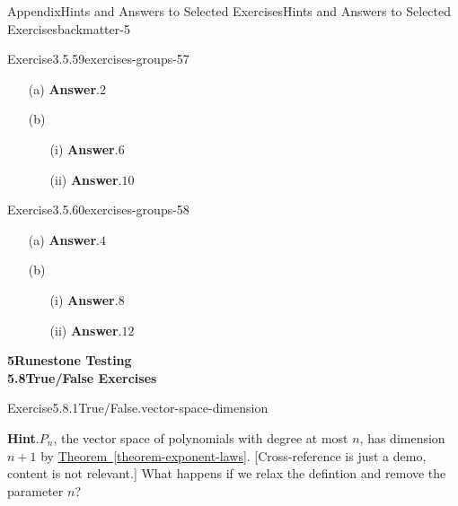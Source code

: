 \documentclass[oneside,10pt,]{book}
\newcommand{\blocktitlefont}{\relax}
\newcommand{\xreffont}{\relax}
\numberwithin{equation}{section}
\begin{document}
\begin{solutions-chapter}{Appendix}{Hints and Answers to Selected Exercises}{}{Hints and Answers to Selected Exercises}{}{}{backmatter-5}
\begin{divisionsolution}{Exercise}{3.5.59}{}{exercises-groups-57}
\begin{enumerate}[font=\bfseries,label=(\alph*),ref=\alph*]%
\item[(a)]\noindent\textbf{\blocktitlefont Answer}.\hypertarget{exercises-groups-57-2-2-back}{}\quad{}\(2\)%
\item[(b)]\begin{enumerate}[font=\bfseries,label=(\roman*),ref=\theenumi.\roman*]%
\item[(i)]\noindent\textbf{\blocktitlefont Answer}.\hypertarget{exercises-groups-57-3-2-2-back}{}\quad{}\(6\)%
\item[(ii)]\noindent\textbf{\blocktitlefont Answer}.\hypertarget{exercises-groups-57-3-3-2-back}{}\quad{}\(10\)%
\end{enumerate}%
\end{enumerate}%
\end{divisionsolution}%
\begin{divisionsolution}{Exercise}{3.5.60}{}{exercises-groups-58}%
\begin{enumerate}[font=\bfseries,label=(\alph*),ref=\alph*]%
\item[(a)]\noindent\textbf{\blocktitlefont Answer}.\hypertarget{exercises-groups-58-2-2-back}{}\quad{}\(4\)%
\item[(b)]\begin{enumerate}[font=\bfseries,label=(\roman*),ref=\theenumi.\roman*]%
\item[(i)]\noindent\textbf{\blocktitlefont Answer}.\hypertarget{exercises-groups-58-3-2-2-back}{}\quad{}\(8\)%
\item[(ii)]\noindent\textbf{\blocktitlefont Answer}.\hypertarget{exercises-groups-58-3-3-2-back}{}\quad{}\(12\)%
\end{enumerate}%
\end{enumerate}%
\end{divisionsolution}%
\par\medskip
\noindent\textbf{\Large{}5\space\textperiodcentered\space{}Runestone Testing\\
5.8\space\textperiodcentered\space{}True\slash{}False Exercises}
\begin{divisionsolution}{Exercise}{5.8.1}{True\slash{}False.}{vector-space-dimension}%
\par\smallskip%
\noindent\textbf{\blocktitlefont Hint}.\hypertarget{vector-space-dimension-4-back}{}\quad{}\(P_n\), the vector space of polynomials with degree at most \(n\), has dimension \(n+1\) by \hyperref[theorem-exponent-laws]{Theorem~{\xreffont\ref{theorem-exponent-laws}}}.  [Cross-reference is just a demo, content is not relevant.]  What happens if we relax the defintion and remove the parameter \(n\)?%

\end{divisionsolution}
\end{solutions-chapter}
\end{document}
